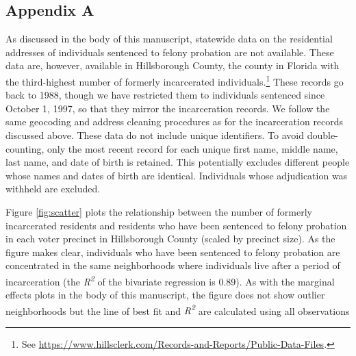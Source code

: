 \documentclass[
  12pt,
]{article}
\begin{document}
\newpage

\hypertarget{appendix-a}{%
\subsection*{Appendix A}\label{appendix-a}}

As discussed in the body of this manuscript, statewide data on the residential addresses of individuals sentenced to felony probation are not available. These data are, however, available in Hillsborough County, the county in Florida with the third-highest number of formerly incarcerated individuals.\footnote{See \url{https://www.hillsclerk.com/Records-and-Reports/Public-Data-Files}.} These records go back to 1988, though we have restricted them to individuals sentenced since October 1, 1997, so that they mirror the incarceration records. We follow the same geocoding and address cleaning procedures as for the incarceration records discussed above. These data do not include unique identifiers. To avoid double-counting, only the most recent record for each unique first name, middle name, last name, and date of birth is retained. This potentially excludes different people whose names and dates of birth are identical. Individuals whose adjudication was withheld are excluded.

Figure \ref{fig:scatter} plots the relationship between the number of formerly incarcerated residents and residents who have been sentenced to felony probation in each voter precinct in Hillsborough County (scaled by precinct size). As the figure makes clear, individuals who have been sentenced to felony probation are concentrated in the same neighborhoods where individuals live after a period of incarceration (the \emph{R\textsuperscript{2}} of the bivariate regression is 0.89). As with the marginal effects plots in the body of this manuscript, the figure does not show outlier neighborhoods but the line of best fit and \emph{R\textsuperscript{2}} are calculated using all observations
\end{document}
